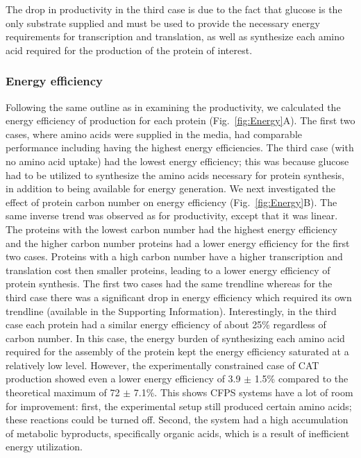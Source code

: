 \documentclass[journal=asbcd6,manuscript=article]{achemso}
\begin{document}
The drop in productivity in the third case is due to the fact that glucose is the only substrate supplied and must be used to provide the necessary energy requirements for transcription and translation, as well as synthesize each amino acid required for the production of the protein of interest.

\subsubsection{Energy efficiency}
Following the same outline as in examining the productivity, we calculated the energy efficiency of production for each protein (Fig.~\ref{fig:Energy}A).
The first two cases, where amino acids were supplied in the media, had comparable performance including having the highest energy efficiencies.
The third case (with no amino acid uptake) had the lowest energy efficiency; this was because glucose had to be utilized to synthesize the amino acids necessary for protein synthesis, in addition to being available for energy generation.
We next investigated the effect of protein carbon number on energy efficiency (Fig.~\ref{fig:Energy}B).
The same inverse trend was observed as for productivity, except that it was linear.
The proteins with the lowest carbon number had the highest energy efficiency and the higher carbon number proteins had a lower energy efficiency for the first two cases.
Proteins with a high carbon number have a higher transcription and translation cost then smaller proteins, leading to a lower energy efficiency of protein synthesis.
The first two cases had the same trendline whereas for the third case there was a significant drop in energy efficiency which required its own trendline (available in the Supporting Information).
Interestingly, in the third case each protein had a similar energy efficiency of about 25\% regardless of carbon number.
In this case, the energy burden of synthesizing each amino acid required for the assembly of the protein kept the energy efficiency saturated at a relatively low level.
However, the experimentally constrained case of CAT production showed even a lower energy efficiency of 3.9 $\pm$ 1.5\% compared to the theoretical maximum of 72 $\pm$ 7.1\%.
This shows CFPS systems have a lot of room for improvement: first, the experimental setup still produced certain amino acids; these reactions could be turned off.
Second, the system had a high accumulation of metabolic byproducts, specifically organic acids, which is a result of inefficient energy utilization.
\end{document}
